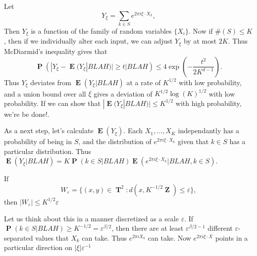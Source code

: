 \documentclass[12pt,reqno]{article}
\numberwithin{equation}{section}
\DeclareMathOperator{\RR}{\mathbf{R}}
\DeclareMathOperator{\ZZ}{\mathbf{Z}}
\DeclareMathOperator{\TT}{\mathbf{T}}
\DeclareMathOperator{\EE}{\mathbf{E}}
\DeclareMathOperator{\PP}{\mathbf{P}}
\begin{document}
Let
%
\[ Y_\xi = \sum_{k \in S} e^{2 \pi i \xi \cdot X_k}, \]
%
Then $Y_\xi$ is a function of the family of random variables $\{ X_i \}$. Now if $\#(S) \leq K$, then if we individually alter each input, we can adjust $Y_\xi$ by at most $2K$. Thus McDiarmid's inequality gives that
%
\[ \PP \left( |Y_\xi - \EE(Y_\xi|BLAH)| \geq t | BLAH \right) \leq 4 \exp \left(- \frac{t^2}{2K^{d-1}} \right). \]
%
Thus $Y_\xi$ deviates from $\EE(Y_\xi|BLAH)$ at a rate of $K^{1/2}$ with low probability, and a union bound over all $\xi$ gives a deviation of $K^{1/2} \log(K)^{1/2}$ with low probability. If we can show that $|\EE(Y_\xi|BLAH)| \leq K^{1/2}$ with high probability, we're be done!.

As a next step, let's calculate $\EE(Y_\xi)$. Each $X_1, \dots, X_K$ independantly has a probability of being in $S$, and the distribution of $e^{2 \pi i \xi \cdot X_k}$ given that $k \in S$ has a particular distribution. Thus $\EE(Y_\xi|BLAH) = K \PP(k \in S|BLAH) \EE(e^{2 \pi i \xi \cdot X_k}|BLAH, k \in S)$.

If
%
\[ W_\varepsilon = \{ (x,y) \in \TT^2: d(x,K^{-1/2} \ZZ) \leq \varepsilon \}, \]
%
then $|W_\varepsilon| \leq K^{1/2} \varepsilon$

Let us think about this in a manner discretized as a scale $\varepsilon$. If $\PP(k \in S| BLAH) \geq K^{-1/2} = \varepsilon^{\beta/2}$, then there are at least $\varepsilon^{\beta/2-1}$ different $\varepsilon$-separated values that $X_k$ can take. Thus $e^{2 \pi i X_k}$ can take. Now $e^{2 \pi i \xi \cdot X}$ points in a particular direction on $|\xi| \varepsilon^{-1}$

\begin{comment}
Suppose we can show that for any $\xi \neq 0$,
%
\[ |\widehat{Y_1}(\xi) + \dots + \widehat{Y_N}(\xi)| \lesssim C \left( \| \widehat{Y_1} \|_{L^\infty(\RR^d)}^2 + \dots + \| \widehat{Y_N} \|_{L^\infty(\ZZ^d)}^2 \right)^{1/2}. \]
%
In the example we consider, this would then imply
%
\[ |Y_1(\xi) + \dots + Y_N(\xi)| \lesssim N^{1/2}. \]
%
Thus in the last theorem we can take $N = K$,
%
\[ N \leq K^{1 - (2d/\beta)(1 - 1/p)} \]
%
If we can set $p \geq 1$, 
\end{comment}
\end{document}
